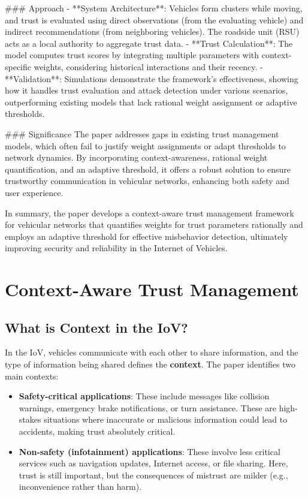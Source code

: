 \documentclass{article}
\begin{document}
### Approach
- **System Architecture**: Vehicles form clusters while moving, and trust is evaluated using direct observations (from the evaluating vehicle) and indirect recommendations (from neighboring vehicles). The roadside unit (RSU) acts as a local authority to aggregate trust data.
- **Trust Calculation**: The model computes trust scores by integrating multiple parameters with context-specific weights, considering historical interactions and their recency.
- **Validation**: Simulations demonstrate the framework’s effectiveness, showing how it handles trust evaluation and attack detection under various scenarios, outperforming existing models that lack rational weight assignment or adaptive thresholds.

### Significance
The paper addresses gaps in existing trust management models, which often fail to justify weight assignments or adapt thresholds to network dynamics. By incorporating context-awareness, rational weight quantification, and an adaptive threshold, it offers a robust solution to ensure trustworthy communication in vehicular networks, enhancing both safety and user experience.

In summary, the paper develops a context-aware trust management framework for vehicular networks that quantifies weights for trust parameters rationally and employs an adaptive threshold for effective misbehavior detection, ultimately improving security and reliability in the Internet of Vehicles.
\section*{Context-Aware Trust Management}

\subsection*{What is Context in the IoV?}
In the IoV, vehicles communicate with each other to share information, and the type of information being shared defines the \textbf{context}. The paper identifies two main contexts:
\begin{itemize}
    \item \textbf{Safety-critical applications}: These include messages like collision warnings, emergency brake notifications, or turn assistance. These are high-stakes situations where inaccurate or malicious information could lead to accidents, making trust absolutely critical.
    \item \textbf{Non-safety (infotainment) applications}: These involve less critical services such as navigation updates, Internet access, or file sharing. Here, trust is still important, but the consequences of mistrust are milder (e.g., inconvenience rather than harm).
\end{itemize}
\end{document}
